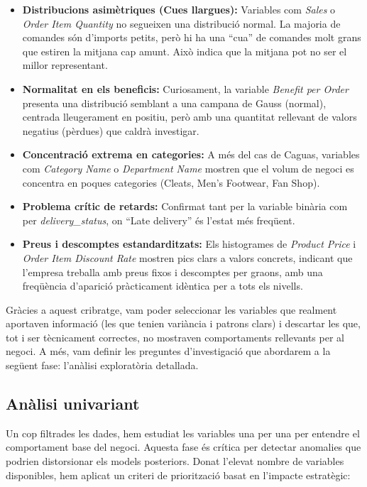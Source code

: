 \documentclass[12pt,a4paper]{article}
\begin{document}
\begin{itemize}
    \item \textbf{Distribucions asimètriques (Cues llargues):} Variables com \textit{Sales} o \textit{Order Item Quantity} no segueixen una distribució normal. La majoria de comandes són d'imports petits, però hi ha una ``cua'' de comandes molt grans que estiren la mitjana cap amunt. Això indica que la mitjana pot no ser el millor representant.
    \item \textbf{Normalitat en els beneficis:} Curiosament, la variable \textit{Benefit per Order} presenta una distribució semblant a una campana de Gauss (normal), centrada lleugerament en positiu, però amb una quantitat rellevant de valors negatius (pèrdues) que caldrà investigar.
    
    \item \textbf{Concentració extrema en categories:} A més del cas de Caguas, variables com \textit{Category Name} o \textit{Department Name} mostren que el volum de negoci es concentra en poques categories (Cleats, Men's Footwear, Fan Shop).
    
    \item \textbf{Problema crític de retards:} Confirmat tant per la variable binària com per \textit{delivery\_status}, on ``Late delivery'' és l'estat més freqüent.
    
    \item \textbf{Preus i descomptes estandarditzats:} Els histogrames de \textit{Product Price} i \textit{Order Item Discount Rate} mostren pics clars a valors concrets, indicant que l'empresa treballa amb preus fixos i descomptes per graons, amb una freqüència d'aparició pràcticament idèntica per a tots els nivells.
\end{itemize}

Gràcies a aquest cribratge, vam poder seleccionar les variables que realment aportaven informació (les que tenien variància i patrons clars) i descartar les que, tot i ser tècnicament correctes, no mostraven comportaments rellevants per al negoci. A més, vam definir les preguntes d'investigació que abordarem a la següent fase: l'anàlisi exploratòria detallada.
\subsection{Anàlisi univariant}
Un cop filtrades les dades, hem estudiat les variables una per una per entendre el comportament base del negoci. Aquesta fase és crítica per detectar anomalies que podrien distorsionar els models posteriors. Donat l'elevat nombre de variables disponibles, hem aplicat un criteri de priorització basat en l'impacte estratègic:
\end{document}
